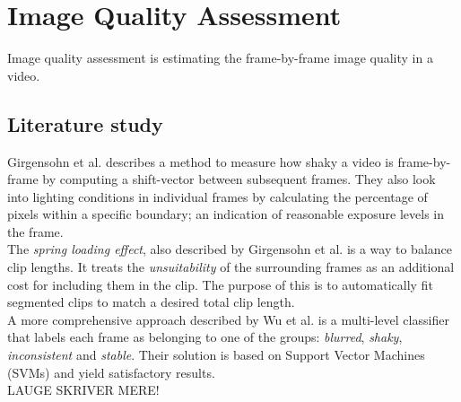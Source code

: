%
\section{Image Quality Assessment}
%
Image quality assessment is estimating the frame-by-frame image quality in a video. %
%
\subsection{Literature study}
Girgensohn et al.\cite{Girgensohn:2000:SAH:354401.354415} describes a method to measure how shaky a video is frame-by-frame by computing a shift-vector between subsequent frames. They also look into lighting conditions in individual frames by calculating the percentage of pixels within a specific boundary; an indication of reasonable exposure levels in the frame.\\
The \textit{spring loading effect}\cite{Girgensohn:2000:SAH:354401.354415}, also described by Girgensohn et al. is a way to balance clip lengths. It treats the \textit{unsuitability} of the surrounding frames as an additional cost for including them in the clip. The purpose of this is to automatically fit segmented clips to match a desired total clip length.\\
%
A more comprehensive approach described by Wu et al.\cite{10.1109/ICME.2005.1521399} is a multi-level classifier that labels each frame as belonging to one of the groups: \textit{blurred}, \textit{shaky}, \textit{inconsistent} and \textit{stable}. Their solution is based on Support Vector Machines (SVMs) and yield satisfactory results.\\ %
LAUGE SKRIVER MERE!
%
